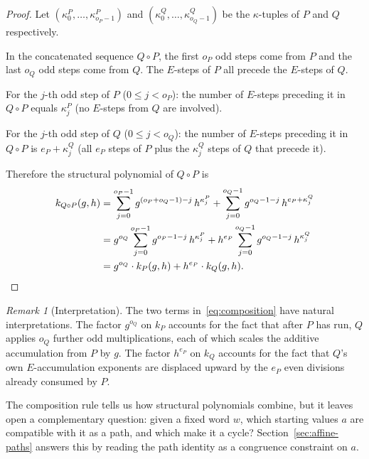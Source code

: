 \documentclass[12pt]{article}
\theoremstyle{definition}
\theoremstyle{remark}
\newtheorem{remark}[theorem]{Remark}
\newcommand{\kpoly}{k}
\begin{document}
\begin{proof}
Let $(\kappa^P_0, \ldots, \kappa^P_{o_P-1})$ and
$(\kappa^Q_0, \ldots, \kappa^Q_{o_Q-1})$ be the $\kappa$-tuples of
$P$ and $Q$ respectively.

In the concatenated sequence $Q \circ P$, the first $o_P$ odd steps come from
$P$ and the last $o_Q$ odd steps come from $Q$.  The $E$-steps of $P$ all
precede the $E$-steps of $Q$.

For the $j$-th odd step of $P$ ($0 \leq j < o_P$): the number of $E$-steps
preceding it in $Q \circ P$ equals $\kappa^P_j$ (no $E$-steps from $Q$ are
involved).

For the $j$-th odd step of $Q$ ($0 \leq j < o_Q$): the number of $E$-steps
preceding it in $Q \circ P$ is $e_P + \kappa^Q_j$ (all $e_P$ steps of $P$
plus the $\kappa^Q_j$ steps of $Q$ that precede it).

Therefore the structural polynomial of $Q \circ P$ is
\begin{align*}
  \kpoly_{Q\circ P}(g,h)
  &= \sum_{j=0}^{o_P-1} g^{(o_P + o_Q - 1) - j}\, h^{\kappa^P_j}
     + \sum_{j=0}^{o_Q-1} g^{o_Q - 1 - j}\, h^{e_P + \kappa^Q_j} \\
  &= g^{o_Q} \sum_{j=0}^{o_P-1} g^{o_P-1-j}\, h^{\kappa^P_j}
     + h^{e_P} \sum_{j=0}^{o_Q-1} g^{o_Q-1-j}\, h^{\kappa^Q_j} \\
  &= g^{o_Q}\cdot\kpoly_P(g,h) + h^{e_P}\cdot\kpoly_Q(g,h). \qedhere
\end{align*}
\end{proof}

\begin{remark}[Interpretation]
The two terms in~\eqref{eq:composition} have natural interpretations.
The factor $g^{o_Q}$ on $\kpoly_P$ accounts for the fact that after
$P$ has run, $Q$ applies $o_Q$ further odd multiplications, each of which
scales the additive accumulation from $P$ by $g$.  The factor $h^{e_P}$
on $\kpoly_Q$ accounts for the fact that $Q$'s own $E$-accumulation
exponents are displaced upward by the $e_P$ even divisions already consumed
by $P$.
\end{remark}

The composition rule tells us how structural polynomials combine, but it
leaves open a complementary question: given a fixed word $w$, which starting
values $a$ are compatible with it as a path, and which make it a cycle?
Section~\ref{sec:affine-paths} answers this by reading the path identity as
a congruence constraint on $a$.

\end{document}
